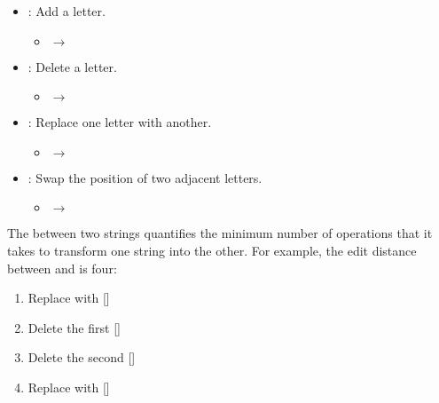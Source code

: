 \begin{itemize}
\item \mbox{}: Add a letter.
  \begin{itemize}
  \item[]     $\rightarrow$ 
  \end{itemize}
  \item \mbox{}: Delete a letter.
    \begin{itemize}
    \item[]  $\rightarrow$ 
    \end{itemize}

\item \mbox{}: Replace one letter with another.
  \begin{itemize}
  \item[]  $\rightarrow$ 
  \end{itemize}
  \item \mbox{}: Swap the position of two adjacent letters.
    \begin{itemize}
    \item[]   $\rightarrow$ 
    \end{itemize}
\end{itemize}



The  between two strings quantifies the minimum
number of operations that it takes to transform one string into the other.  For example, the edit distance between  and  is four: 

\begin{enumerate}

\item Replace  with  []

\item Delete the first  []

\item Delete the second  []

\item Replace  with  []

\end{enumerate}

